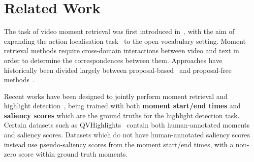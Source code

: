 \section{Related Work}
\label{sec:related_work}
The task of video moment retrieval was first introduced in~\cite{gao2017tall, anne2017localizing}, with the aim of expanding the action localisation task~\cite{Onea2013ActionAE, shou2016temporal} to the open vocabulary setting. Moment retrieval methods require cross-domain interactions between video and text in order to determine the correspondences between them. Approaches have historically been divided largely between proposal-based~\cite{anne2017localizing,cao2021pursuit,gao2017tall,ge2019mac,jiang2019cross,liu2018cross,liu2021context,liu2022exploring,xu2019multilevel,chen2018temporally,qu2020fine,wang2020temporally,zhang20192dtan} and proposal-free methods~\cite{chen2020learning,chen2020hierarchical,chen2020rethinking,chen2021end,hao2022query,liu2022memory,lu2019debug,nan2021interventional,rodriguez2020proposal,yuan2019find,zhang2021natural,zhao2020bottom, zhang2020span}. 

Recent works have been designed to jointly perform moment retrieval and highlight detection~\cite{lei2021qvhl, han2024unleash}, being trained with both \textbf{moment start/end times} and \textbf{saliency scores} which are the ground truths for the highlight detection task. Certain datasets such as QVHighlights~\cite{lei2021qvhl} contain both human-annotated moments and saliency scores. Datasets which do not have human-annotated saliency scores instead use pseudo-saliency scores from the moment start/end times, with a non-zero score within ground truth moments.

